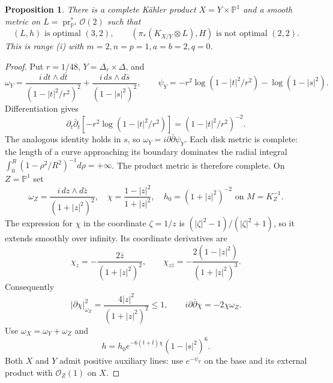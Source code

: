 \documentclass[11pt,reqno]{amsart}
\numberwithin{equation}{section}
\newtheorem{proposition}[theorem]{Proposition}
\theoremstyle{definition}
\theoremstyle{remark}
\newcommand{\OO}{\mathcal O}
\newcommand{\ddbar}{\partial\bar\partial}
\begin{document}
\begin{proposition}\label{prop:counter-i}\label{sec:counter-i}
There is a complete K\"ahler product $X=Y\times\mathbb P^1$ and a
smooth metric on $L=\operatorname{pr}_{\mathbb P^1}^*\OO(2)$ such that
\[
 (L,h)\text{ is optimal }(3,2),\qquad
 (\pi_*(K_{X/Y}\otimes L),H)\text{ is not optimal }(2,2).
\]
This is range (i) with $m=2,n=p=1,a=b=2,q=0$.
\end{proposition}
\begin{proof}
Put $r=1/48$, $Y=\Delta_r\times\Delta$, and
\begin{equation}\label{eq:base-example}
 \omega_Y=\frac{i\,dt\wedge d\bar t}{(1-|t|^2/r^2)^2}
          +\frac{i\,ds\wedge d\bar s}{(1-|s|^2)^2},\qquad
 \psi_Y=-r^2\log(1-|t|^2/r^2)-\log(1-|s|^2).
\end{equation}
Differentiation gives
\[
 \partial_t\bar\partial_t[-r^2\log(1-|t|^2/r^2)]
       =(1-|t|^2/r^2)^{-2}.
\]
The analogous identity holds in $s$, so $\omega_Y=i\ddbar\psi_Y$.
Each disk metric is complete: the length of a curve approaching
its boundary dominates the radial integral
$\int_0^R(1-\rho^2/R^2)^{-1}d\rho=+\infty$.
The product metric is therefore complete.  On
$Z=\mathbb P^1$ set
\[
 \omega_Z=\frac{i\,dz\wedge d\bar z}{(1+|z|^2)^2},\quad
 \chi=\frac{1-|z|^2}{1+|z|^2},\quad
 h_0=(1+|z|^2)^{-2}\text{ on }M=K_Z^{-1}.
\]
The expression for $\chi$ in the coordinate $\zeta=1/z$ is
$(|\zeta|^2-1)/(|\zeta|^2+1)$, so it extends smoothly over infinity.
Its coordinate derivatives are
\[
 \chi_z=-\frac{2\bar z}{(1+|z|^2)^2},\qquad
 \chi_{z\bar z}=-\frac{2(1-|z|^2)}{(1+|z|^2)^3}.
\]
Consequently
\begin{equation}\label{eq:chi-identities}
 |\partial\chi|_{\omega_Z}^2
    =\frac{4|z|^2}{(1+|z|^2)^2}\le1,
 \qquad i\ddbar\chi=-2\chi\omega_Z.
\end{equation}
Use $\omega_X=\omega_Y+\omega_Z$ and
\begin{equation}\label{eq:counter-metric}
 h=h_0e^{-6(t+\bar t)\chi}(1-|s|^2)^6.
\end{equation}
Both $X$ and $Y$ admit positive auxiliary lines: use $e^{-\psi_Y}$
on the base and its external product with $\OO_Z(1)$ on $X$.


\end{proof}
\end{document}
